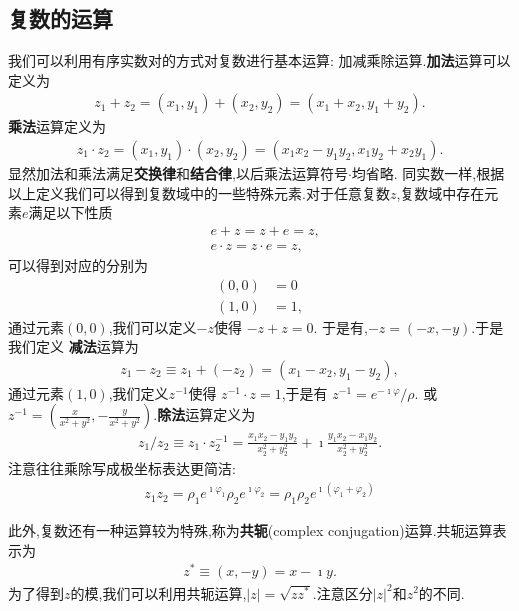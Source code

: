 \subsection{复数的运算}
我们可以利用有序实数对的方式对复数进行基本运算: 加减乘除运算.{\bf 加法}运算可以定义为
\begin{align}
    z_1 + z_2 = (x_1, y_1) + (x_2, y_2) = (x_1 + x_2, y_1 + y_2) .
\end{align}
{\bf 乘法}运算定义为
\begin{align}
    z_1 \cdot z_2 = (x_1, y_1) \cdot (x_2, y_2) = (x_1 x_2 - y_1 y_2, x_1 y_2 + x_2 y_1) .
\end{align}
显然加法和乘法满足{\bf 交换律}和{\bf 结合律},以后乘法运算符号$\cdot$均省略.
同实数一样,根据以上定义我们可以得到复数域中的一些特殊元素.对于任意复数$z$,复数域中存在元素$e$满足以下性质
\begin{align}
    & e + z = z + e = z ,\\ 
    & e \cdot z = z \cdot e = z , 
\end{align}
可以得到对应的分别为
\begin{align}
    (0, 0) &= 0\\
    (1, 0) &= 1 ,
\end{align}
通过元素$(0,0)$,我们可以定义$-z$使得 $-z + z = 0$. 于是有,$- z = (-x, -y)$.于是我们定义
{\bf 减法}运算为 
\begin{align}
    z_1 - z_2 \equiv z_1 + (-z_2) = (x_1 - x_2, y_1 - y_2) ,
\end{align}
通过元素$(1,0)$,我们定义$z^{-1}$使得
$z^{-1} \cdot z = 1$,于是有 $z^{-1} =e^{-\imath \varphi}/\rho  $.
或$z^{-1} = (\frac{x}{x^2 + y^2}, -\frac{y}{x^2 + y^2})$.{\bf 除法}运算定义为
\begin{align}
    z_1 / z_2 \equiv z_1 \cdot z_2^{-1} = \frac{x_1 x_2 - y_1 y_2} {x_2^2  +  y_2^2 }  + \imath \frac{y_1 x_2 - x_1 y_2} {x_2^2  +  y_2^2 } . 
\end{align}
注意往往乘除写成极坐标表达更简洁:
\begin{align}
    z_1 z_2 = \rho_1 e^{\imath \varphi_1 } \rho_2 e^{\imath \varphi_2 } = \rho_1 \rho_2 e^{\imath (\varphi_1 + \varphi_2)}
\end{align}

此外,复数还有一种运算较为特殊,称为{\bf 共轭}(complex conjugation)运算.共轭运算表示为
\begin{align}
    z^{*} \equiv (x, -y) = x - \imath y .
\end{align}
为了得到$z$的模,我们可以利用共轭运算,$|z| = \sqrt{zz^{*}}$.注意区分$|z|^2$和$z^2$的不同.

